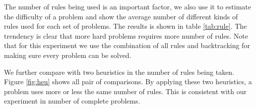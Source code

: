 The number of rules being used is an important factor, we also use it to estimate the difficulty of a problem and show the average number of different kinds of rules used for each set of problems. The results is shown in table \ref{tab:rule}. The trendency is clear that more hard problems requires more number of rules. Note that for this experiment we use the combination of all rules and backtracking for making sure every problem can be solved.

\begin{table}[!h]
    \centering
    \caption{Average number of rules used by problems in different levels. Here, r1: rule 1, r2: rule2, n2: naked double, n3: naked triple, bt: number of backtrackings.}\label{tab:rule}
\end{table}

We further compare with two heuristics in the number of rules being taken. Figure \ref{fig:heu} shows all pair of comparisons. By applying these two heuristics, a problem uses more or less the same number of rules. This is consistent with our experiment in number of complete problems. 

